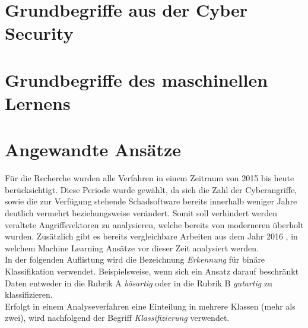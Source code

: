 \documentclass[
    12pt, %
    DIV10,
    ngerman, %
    a4paper, %
    oneside, %
    titlepage, %
    parskip=half, %
    headings=normal, %
    listof=totoc, %
    bibliography=totoc, %
    index=totoc, %
    captions=tableheading, %
    final %
]{scrreprt}
\begin{document}
\section{Grundbegriffe aus der Cyber Security}
\section{Grundbegriffe des maschinellen Lernens}
\section{Angewandte Ansätze}
Für die Recherche wurden alle Verfahren in einem Zeitraum von 2015 bis heute berücksichtigt. Diese Periode wurde gewählt, da sich die Zahl der Cyberangriffe, sowie die zur Verfügung stehende Schadsoftware bereits innerhalb weniger Jahre deutlich vermehrt beziehungsweise verändert. Somit soll verhindert werden veraltete Angriffsvektoren zu analysieren, welche bereits von moderneren überholt wurden. Zusätzlich gibt es bereits vergleichbare Arbeiten aus dem Jahr 2016 \parencite[s.][]{Buczak2016}, in welchem Machine Learning Ansätze vor dieser Zeit analysiert werden.\\
In der folgenden Auflistung wird die Bezeichnung \emph{Erkennung} für binäre Klassifikation verwendet. Beispielsweise, wenn sich ein Ansatz darauf beschränkt Daten entweder in die Rubrik A \emph{bösartig} oder in die Rubrik B \emph{gutartig} zu klassifizieren.\\
Erfolgt in einem Analyseverfahren eine Einteilung in mehrere Klassen (mehr als zwei), wird nachfolgend der Begriff 
\emph{Klassifizierung} verwendet.
\\\\
\end{document}
